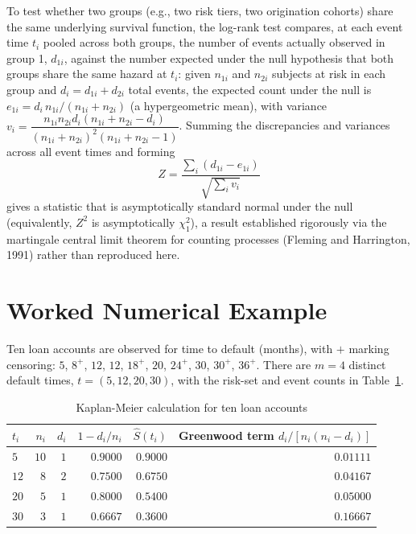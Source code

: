 \documentclass[11pt]{article}
\theoremstyle{remark}
\theoremstyle{definition}
\begin{document}
To test whether two groups (e.g., two risk tiers, two origination cohorts) share the same underlying survival function, the log-rank test compares, at each event time $t_i$ pooled across both groups, the number of events actually observed in group 1, $d_{1i}$, against the number expected under the null hypothesis that both groups share the same hazard at $t_i$: given $n_{1i}$ and $n_{2i}$ subjects at risk in each group and $d_i=d_{1i}+d_{2i}$ total events, the expected count under the null is $e_{1i}=d_i\,n_{1i}/(n_{1i}+n_{2i})$ (a hypergeometric mean), with variance $v_i = \dfrac{n_{1i}n_{2i}d_i(n_{1i}+n_{2i}-d_i)}{(n_{1i}+n_{2i})^2(n_{1i}+n_{2i}-1)}$. Summing the discrepancies and variances across all event times and forming
\begin{equation*}
Z = \frac{\sum_i (d_{1i}-e_{1i})}{\sqrt{\sum_i v_i}}
\end{equation*}
gives a statistic that is asymptotically standard normal under the null (equivalently, $Z^2$ is asymptotically $\chi^2_1$), a result established rigorously via the martingale central limit theorem for counting processes (Fleming and Harrington, 1991) rather than reproduced here.

\section{Worked Numerical Example}
\label{sec:example}

Ten loan accounts are observed for time to default (months), with $+$ marking censoring: $5$, $8^{+}$, $12$, $12$, $18^{+}$, $20$, $24^{+}$, $30$, $30^{+}$, $36^{+}$. There are $m=4$ distinct default times, $t=(5,12,20,30)$, with the risk-set and event counts in Table~\ref{tab:km}.

\begin{table}[htbp]
\centering
\caption{Kaplan-Meier calculation for ten loan accounts}
\label{tab:km}
\begin{tabular}{@{}lrrrrr@{}}
\toprule
$t_i$ & $n_i$ & $d_i$ & $1-d_i/n_i$ & $\hat S(t_i)$ & Greenwood term $d_i/[n_i(n_i-d_i)]$ \\
\midrule
$5$  & $10$ & $1$ & $0.9000$ & $0.9000$ & $0.01111$ \\
$12$ & $8$  & $2$ & $0.7500$ & $0.6750$ & $0.04167$ \\
$20$ & $5$  & $1$ & $0.8000$ & $0.5400$ & $0.05000$ \\
$30$ & $3$  & $1$ & $0.6667$ & $0.3600$ & $0.16667$ \\
\bottomrule
\end{tabular}
\end{table}
\end{document}
